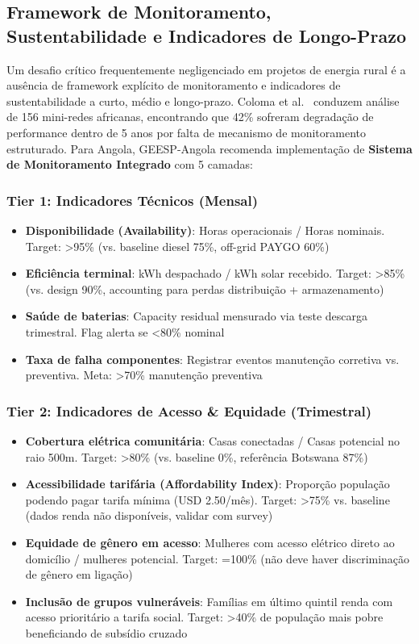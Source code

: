 \documentclass[12pt, a4paper]{article}
\begin{document}
{{{{{{{{{{{{\subsection{Framework de Monitoramento, Sustentabilidade e Indicadores de Longo-Prazo}

Um desafio crítico frequentemente negligenciado em projetos de energia rural é a ausência de framework explícito de monitoramento e indicadores de sustentabilidade a curto, médio e longo-prazo. Coloma et al.~\citep{Coloma2025} conduzem análise de 156 mini-redes africanas, encontrando que 42\% sofreram degradação de performance dentro de 5 anos por falta de mecanismo de monitoramento estruturado. Para Angola, GEESP-Angola recomenda implementação de \textbf{Sistema de Monitoramento Integrado} com 5 camadas:

\subsubsection{Tier 1: Indicadores Técnicos (Mensal)}
\begin{itemize}
\item \textbf{Disponibilidade (Availability)}: Horas operacionais / Horas nominais. Target: >95\% (vs. baseline diesel 75\%, off-grid PAYGO 60\%)
\item \textbf{Eficiência terminal}: kWh despachado / kWh solar recebido. Target: >85\% (vs. design 90\%, accounting para perdas distribuição + armazenamento)
\item \textbf{Saúde de baterias}: Capacity residual mensurado via teste descarga trimestral. Flag alerta se <80\% nominal
\item \textbf{Taxa de falha componentes}: Registrar eventos manutenção corretiva vs. preventiva. Meta: >70\% manutenção preventiva
\end{itemize}

\subsubsection{Tier 2: Indicadores de Acesso & Equidade (Trimestral)}
\begin{itemize}
\item \textbf{Cobertura elétrica comunitária}: Casas conectadas / Casas potencial no raio 500m. Target: >80\% (vs. baseline 0\%, referência Botswana 87\%)
\item \textbf{Acessibilidade tarifária (Affordability Index)}: Proporção população podendo pagar tarifa mínima (USD 2.50/mês). Target: >75\% vs. baseline (dados renda não disponíveis, validar com survey)
\item \textbf{Equidade de gênero em acesso}: Mulheres com acesso elétrico direto ao domicílio / mulheres potencial. Target: =100\% (não deve haver discriminação de gênero em ligação)
\item \textbf{Inclusão de grupos vulneráveis}: Famílias em último quintil renda com acesso prioritário a tarifa social. Target: >40\% de população mais pobre beneficiando de subsídio cruzado
\end{itemize}

}}}}}}}}}}}}
\end{document}
